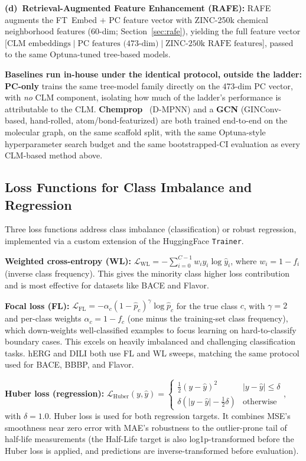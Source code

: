 \documentclass[pdflatex,sn-mathphys-num]{sn-jnl}%
\begin{document}
\textbf{(d)~Retrieval-Augmented Feature Enhancement (RAFE):} RAFE augments the FT~Embed $+$ PC feature vector with ZINC-250k chemical neighborhood features (60-dim; Section~\ref{sec:rafe}), yielding the full feature vector [$\text{CLM embeddings} \mid \text{PC features (473-dim)} \mid \text{ZINC-250k RAFE features}$], passed to the same Optuna-tuned tree-based models.

\textbf{Baselines run in-house under the identical protocol, outside the ladder:} \textbf{PC-only} trains the same tree-model family directly on the 473-dim PC vector, with \emph{no} CLM component, isolating how much of the ladder's performance is attributable to the CLM. \textbf{Chemprop}~\cite{yang2019chemprop} (D-MPNN) and a \textbf{GCN} (GINConv-based, hand-rolled, atom/bond-featurized) are both trained end-to-end on the molecular graph, on the same scaffold split, with the same Optuna-style hyperparameter search budget and the same bootstrapped-CI evaluation as every CLM-based method above.

\subsection{Loss Functions for Class Imbalance and Regression}\label{sec:loss_functions}
Three loss functions address class imbalance (classification) or robust regression, implemented via a custom extension of the HuggingFace \texttt{Trainer}.

\noindent \textbf{Weighted cross-entropy (WL):} $\mathcal{L}_{\text{WL}} = -\sum_{i=0}^{C-1} w_i y_i \log\hat{y}_i$, where $w_i = 1 - f_i$ (inverse class frequency). This gives the minority class higher loss contribution and is most effective for datasets like BACE and Flavor.

\noindent\textbf{Focal loss (FL):} $\mathcal{L}_{\text{FL}} = -\alpha_c (1 - \hat{p}_c)^\gamma \log\hat{p}_c$ for the true class $c$, with $\gamma = 2$ and per-class weights $\alpha_c = 1 - f_c$ (one minus the training-set class frequency), which down-weights well-classified examples to focus learning on hard-to-classify boundary cases. This excels on heavily imbalanced and challenging classification tasks. hERG and DILI both use FL and WL sweeps, matching the same protocol used for BACE, BBBP, and Flavor.

\noindent\textbf{Huber loss (regression):} $\mathcal{L}_{\text{Huber}}(y, \hat y) = \begin{cases}\tfrac{1}{2}(y-\hat y)^2 & |y - \hat y| \le \delta \\ \delta(|y-\hat y| - \tfrac12 \delta) & \text{otherwise}\end{cases}$, with $\delta = 1.0$. Huber loss is used for both regression targets. It combines MSE's smoothness near zero error with MAE's robustness to the outlier-prone tail of half-life measurements (the Half-Life target is also log1p-transformed before the Huber loss is applied, and predictions are inverse-transformed before evaluation).
\end{document}
